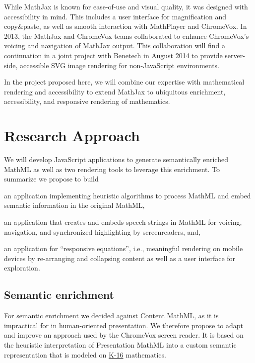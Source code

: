 \documentclass[12pt]{amsart}
\begin{document}
While MathJax is known for ease-of-use and visual quality, it was designed with 
accessibility in mind. This includes a user interface for magnification and 
copy\&paste, as well as smooth interaction with MathPlayer and ChromeVox. In 
2013, the MathJax and ChromeVox teams collaborated to enhance ChromeVox's 
voicing and navigation of MathJax output. This collaboration will find a 
continuation in a joint project with Benetech in August 2014 to provide 
server-side, accessible SVG image rendering for non-JavaScript environments.

In the project proposed here, we will combine our expertise with mathematical rendering and 
accessibility to extend MathJax to ubiquitous enrichment, accessibility, and 
responsive rendering of mathematics.


\section{Research Approach}

We will develop JavaScript applications to generate semantically enriched  
MathML as well as two rendering tools to leverage this enrichment. To 
summarize we propose to build

\begin{compactenum}
\item an application implementing heuristic algorithms to process 
MathML and embed semantic information in the original MathML,
\item an application that creates  and embeds speech-strings in MathML for 
voicing, navigation, and synchronized highlighting by screenreaders, and,
\item an application for ``responsive equations'', i.e., meaningful rendering 
on mobile 
devices by re-arranging and collapsing content as well as a user 
interface for exploration.
\end{compactenum}

\subsection{Semantic enrichment}

For semantic enrichment we decided against Content MathML, as it is 
impractical for in human-oriented presentation. We therefore propose 
to adapt and improve an approach used by the ChromeVox screen reader. It is based on 
the heuristic interpretation of Presentation MathML into a custom semantic 
representation that is modeled on 
\href{http://en.wikipedia.org/wiki/K-16_(education)}{K-16} mathematics.
\end{document}
